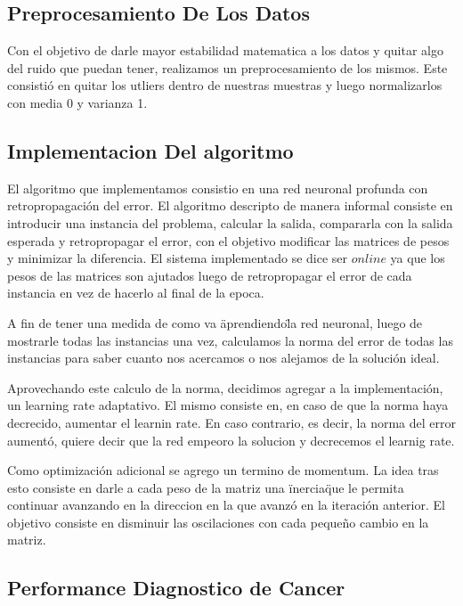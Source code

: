 \subsection{Preprocesamiento De Los Datos} 
Con el objetivo de darle mayor estabilidad matematica a los datos y quitar algo del ruido que puedan tener, realizamos un preprocesamiento de los mismos. Este consistió en quitar los utliers dentro de nuestras muestras y luego normalizarlos con media 0 y varianza 1.

\subsection{Implementacion Del algoritmo} 

El algoritmo que implementamos consistio en una red neuronal profunda con retropropagación del error. El algoritmo descripto de manera informal consiste en introducir una instancia del problema, calcular la salida, compararla con la salida esperada y retropropagar el error, con el objetivo modificar las matrices de pesos y minimizar la diferencia. El sistema implementado se dice ser $online$ ya que los pesos de las matrices son ajutados luego de retropropagar el error de cada instancia en vez de hacerlo al final de la epoca.

A fin de tener una medida de como va \"aprendiendo\" la red neuronal, luego de mostrarle todas las instancias una vez, calculamos la norma del error de todas las instancias para saber cuanto nos acercamos o nos alejamos de la solución ideal.

Aprovechando este calculo de la norma, decidimos agregar a la implementación, un learning rate adaptativo. El mismo consiste en, en caso de que la norma haya decrecido, aumentar el learnin rate. En caso contrario, es decir, la norma del error aumentó, quiere decir que la red empeoro la solucion y decrecemos el learnig rate.

Como optimización adicional se agrego un termino de momentum. La idea tras esto consiste en darle a cada peso de la matriz una \"inercia\" que le permita continuar avanzando en la direccion en la que avanzó en la iteración anterior. El objetivo consiste en disminuir las oscilaciones con cada pequeño cambio en la matriz.

\subsection{Performance Diagnostico de Cancer} 

